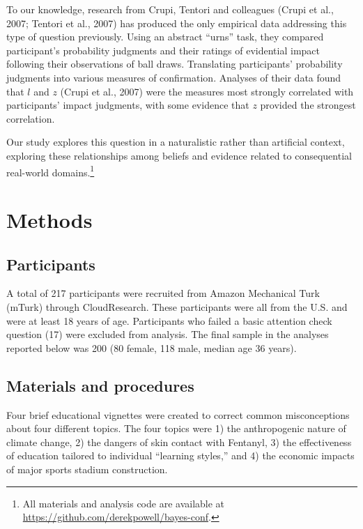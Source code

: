 \documentclass[10pt, letterpaper]{article}
\begin{document}
To our knowledge, research from Crupi, Tentori and colleagues (Crupi et
al., 2007; Tentori et al., 2007) has produced the only empirical data
addressing this type of question previously. Using an abstract ``urns''
task, they compared participant's probability judgments and their
ratings of evidential impact following their observations of ball draws.
Translating participants' probability judgments into various measures of
confirmation. Analyses of their data found that \(l\) and \(z\) (Crupi
et al., 2007) were the measures most strongly correlated with
participants' impact judgments, with some evidence that \(z\) provided
the strongest correlation.

Our study explores this question in a naturalistic rather than
artificial context, exploring these relationships among beliefs and
evidence related to consequential real-world domains.\footnote{All
  materials and analysis code are available at
  \url{https://github.com/derekpowell/bayes-conf}.}

\hypertarget{methods}{%
\section{Methods}\label{methods}}

\hypertarget{participants}{%
\subsection{Participants}\label{participants}}

A total of 217 participants were recruited from Amazon Mechanical Turk
(mTurk) through CloudResearch. These participants were all from the U.S.
and were at least 18 years of age. Participants who failed a basic
attention check question (17) were excluded from analysis. The final
sample in the analyses reported below was 200 (80 female, 118 male,
median age 36 years).

\hypertarget{materials-and-procedures}{%
\subsection{Materials and procedures}\label{materials-and-procedures}}

Four brief educational vignettes were created to correct common
misconceptions about four different topics. The four topics were 1) the
anthropogenic nature of climate change, 2) the dangers of skin contact
with Fentanyl, 3) the effectiveness of education tailored to individual
``learning styles,'' and 4) the economic impacts of major sports stadium
construction.
\end{document}
